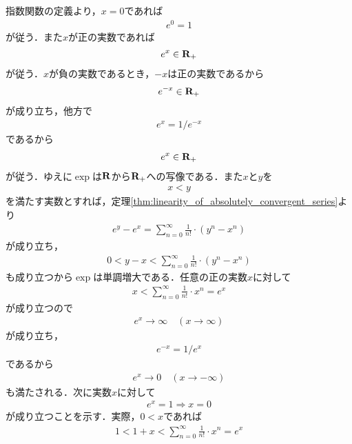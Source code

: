 	\begin{sketch}
		指数関数の定義より，$x = 0$であれば
		\begin{align}
			e^0 = 1
		\end{align}
		が従う．また$x$が正の実数であれば
		\begin{align}
			e^{x} \in \mathbf{R}_+
		\end{align}
		が従う．$x$が負の実数であるとき，$-x$は正の実数であるから
		\begin{align}
			e^{-x} \in \mathbf{R}_+
		\end{align}
		が成り立ち，他方で
		\begin{align}
			e^{x} = 1/e^{-x}
		\end{align}
		であるから
		\begin{align}
			e^{x} \in \mathbf{R}_+
		\end{align}
		が従う．ゆえに$\exp$は$\mathbf{R}$から$\mathbf{R}_+$への写像である．また$x$と$y$を
		\begin{align}
			x < y
		\end{align}
		を満たす実数とすれば，定理\ref{thm:linearity_of_absolutely_convergent_series}より
		\begin{align}
			e^{y} - e^{x} = \sum_{n=0}^{\infty} \frac{1}{n!} \cdot (y^n - x^n) 
		\end{align}
		が成り立ち，
		\begin{align}
			0 < y - x < \sum_{n=0}^{\infty} \frac{1}{n!} \cdot (y^n - x^n) 
		\end{align}
		も成り立つから$\exp$は単調増大である．任意の正の実数$x$に対して
		\begin{align}
			x < \sum_{n=0}^{\infty} \frac{1}{n!} \cdot x^n = e^{x}
		\end{align}
		が成り立つので
		\begin{align}
			e^x \longrightarrow \infty \quad (x \longrightarrow \infty)
		\end{align}
		が成り立ち，
		\begin{align}
			e^{-x} = 1/e^{x}
		\end{align}
		であるから
		\begin{align}
			e^x \longrightarrow 0 \quad (x \longrightarrow -\infty)
		\end{align}
		も満たされる．次に実数$x$に対して
		\begin{align}
			e^x = 1 \Longrightarrow x=0
			\label{fom:thm_real_valued_exponential_function}
		\end{align}
		が成り立つことを示す．実際，$0 < x$であれば
		\begin{align}
			1 < 1 + x < \sum_{n=0}^{\infty} \frac{1}{n!} \cdot x^n = e^{x}

\end{align}
\end{sketch}
